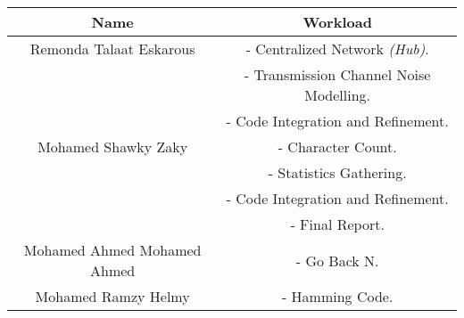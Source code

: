 \begin{center}
\begin{tabular}{||c |c ||} 
 \hline
 Name & Workload \\ [0.5ex] 
 \hline\hline
 Remonda Talaat Eskarous & - Centralized Network \emph{(Hub)}. \\
  & - Transmission Channel Noise Modelling. \\
  & - Code Integration and Refinement.  \\
  \hline
 Mohamed Shawky Zaky & - Character Count. \\
  & - Statistics Gathering. \\
  & - Code Integration and Refinement.  \\
  & - Final Report.  \\
 \hline
 Mohamed Ahmed Mohamed Ahmed & - Go Back N. \\
 \hline
 Mohamed Ramzy Helmy &  - Hamming Code. \\ [1ex] 
 \hline
\end{tabular}
\end{center}